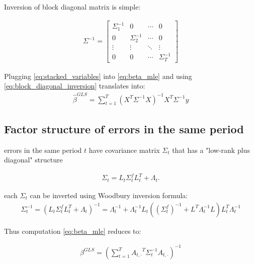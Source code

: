 Inversion of block diagonal matrix is simple:

\begin{align}
	\label{eq:block_diagonal_inversion}
	\Sigma^{-1} = \begin{bmatrix}
		\Sigma_1^{-1} & 0 & \cdots & 0 \\
		0 & \Sigma_2^{-1} & \cdots & 0 \\
		\vdots & \vdots & \ddots & \vdots \\
		0 & 0 & \cdots & \Sigma_T^{-1}
	\end{bmatrix}
\end{align}

Plugging \autoref{eq:stacked_variables} into \autoref{eq:beta_mle} and using \autoref{eq:block_diagonal_inversion} translates into:
\begin{align}
	\label{eq:beta_mle}
	\hat{\beta}^{GLS} = \sum_{t=1}^T (X^T \Sigma^{-1} X)^{-1} X^T \Sigma^{-1} y
\end{align}


\subsection{Factor structure of errors in the same period}

errors in the same period $t$ have covariance matrix $\Sigma_t$ that has a "low-rank plus diagonal" structure 

\begin{align}
	\Sigma_t = L_t \Sigma^f_t L_t^T + \Lambda_t.
\end{align}


each $\Sigma_t$ can be inverted using Woodbury inversion formula:
\begin{align}
	\Sigma_t^{-1} = (L_t \Sigma^f_t L_t^T + \Lambda_t)^{-1} = \Lambda_t^{-1} + \Lambda_t^{-1} L_t ((\Sigma^f_t) ^ {-1} + L^T \Lambda_t^{-1} L ) L_t^T \Lambda_t^{-1}
\end{align}


Thus computation \autoref{eq:beta_mle} reduces to:

\begin{align}
	\beta^{GLS} = \left(\sum_{t=1}^T {A_{t,\cdot}} ^ T \Sigma_t^{-1} A_{t,\cdot} \right) ^{-1}
\end{align}
